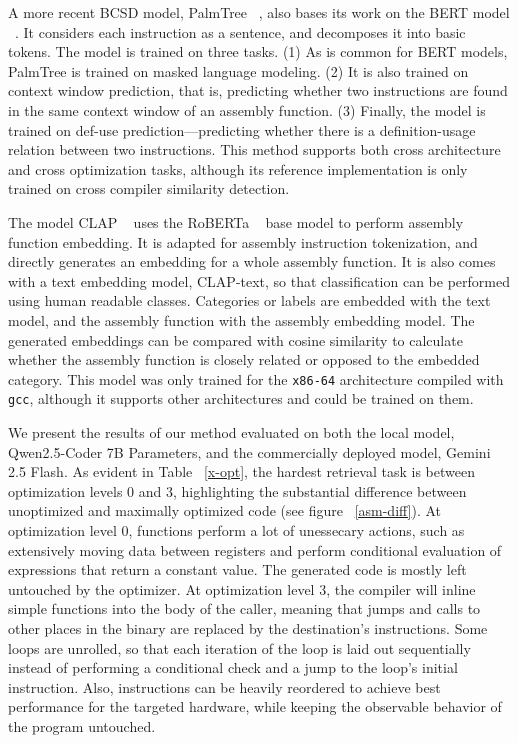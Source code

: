 A more recent BCSD model, PalmTree ~\cite{PalmTree}, also bases its work on the BERT model ~\cite{BERT}.
It considers each instruction as a sentence, and decomposes it into basic tokens. The model is trained
on three tasks. (1) As is common for BERT models, PalmTree is trained on masked language modeling. (2)
It is also trained on context window prediction, that is, predicting whether two instructions are found
in the same context window of an assembly function. (3) Finally, the model is trained on def-use prediction---predicting
whether there is a definition-usage relation between two instructions. This method supports
both cross architecture and cross optimization tasks, although its reference implementation is only
trained on cross compiler similarity detection.

The model CLAP ~\cite{CLAP} uses the RoBERTa ~\cite{RoBERTa} base model to perform assembly function embedding.
It is adapted for assembly instruction tokenization, and directly generates an embedding for
a whole assembly function. It is also comes with a text embedding model, CLAP-text, so that classification can
be performed using human readable classes. Categories or labels are embedded with the text model, and the
assembly function with the assembly embedding model. The generated embeddings can be compared with cosine similarity to
calculate whether the assembly function is closely related or opposed to the embedded category. This model was only trained
for the \texttt{x86-64} architecture compiled with \texttt{gcc}, although it supports other architectures and could be trained on
them.

We present the results of our method evaluated on both the local model, Qwen2.5-Coder 7B Parameters, and the commercially deployed model,
Gemini 2.5 Flash. As evident in Table ~\ref{x-opt}, the hardest retrieval task is between optimization levels \(0\) and \(3\),
highlighting the substantial difference between unoptimized and maximally optimized code (see figure ~\ref{asm-diff}).
At optimization level \(0\), functions perform a lot of unessecary actions, such as extensively moving
data between registers and perform conditional evaluation of expressions that return a constant value. The generated code
is mostly left untouched by the optimizer. At optimization level \(3\), the compiler will inline simple functions into the
body of the caller, meaning that jumps and calls to other places in the binary are replaced by the destination's instructions.
Some loops are unrolled, so that each iteration of the loop is laid out sequentially instead of performing a conditional check
and a jump to the loop's initial instruction. Also, instructions can be heavily reordered to achieve best performance for the targeted
hardware, while keeping the observable behavior of the program untouched.

